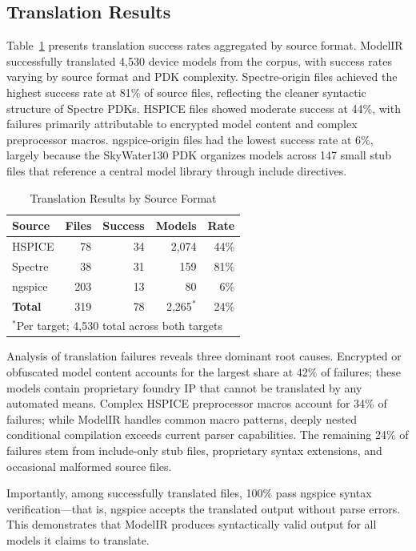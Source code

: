 \documentclass[conference]{IEEEtran}
\begin{document}
\subsection{Translation Results}

Table~\ref{tab:results} presents translation success rates aggregated by source format. ModelIR successfully translated 4,530 device models from the corpus, with success rates varying by source format and PDK complexity. Spectre-origin files achieved the highest success rate at 81\% of source files, reflecting the cleaner syntactic structure of Spectre PDKs. HSPICE files showed moderate success at 44\%, with failures primarily attributable to encrypted model content and complex preprocessor macros. ngspice-origin files had the lowest success rate at 6\%, largely because the SkyWater130 PDK organizes models across 147 small stub files that reference a central model library through include directives.

\begin{table}[!t]
\caption{Translation Results by Source Format}
\label{tab:results}
\centering
\renewcommand{\arraystretch}{1.15}
\begin{tabular}{@{}lrrrr@{}}
\toprule
\textbf{Source} & \textbf{Files} & \textbf{Success} & \textbf{Models} & \textbf{Rate} \\
\midrule
HSPICE & 78 & 34 & 2,074 & 44\% \\
Spectre & 38 & 31 & 159 & 81\% \\
ngspice & 203 & 13 & 80 & 6\% \\
\midrule
\textbf{Total} & 319 & 78 & 2,265$^*$ & 24\% \\
\bottomrule
\multicolumn{5}{l}{\footnotesize $^*$Per target; 4,530 total across both targets}
\end{tabular}
\end{table}

Analysis of translation failures reveals three dominant root causes. Encrypted or obfuscated model content accounts for the largest share at 42\% of failures; these models contain proprietary foundry IP that cannot be translated by any automated means. Complex HSPICE preprocessor macros account for 34\% of failures; while ModelIR handles common macro patterns, deeply nested conditional compilation exceeds current parser capabilities. The remaining 24\% of failures stem from include-only stub files, proprietary syntax extensions, and occasional malformed source files.

Importantly, among successfully translated files, 100\% pass ngspice syntax verification---that is, ngspice accepts the translated output without parse errors. This demonstrates that ModelIR produces syntactically valid output for all models it claims to translate.
\end{document}
